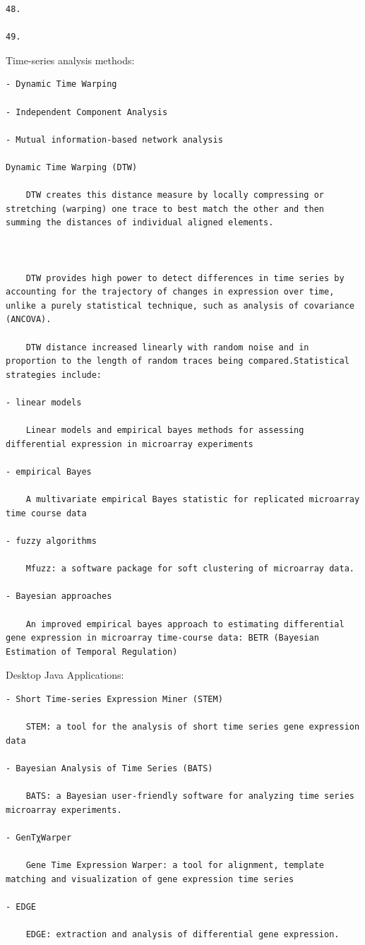 \documentclass[
]{book}
\begin{document}
\begin{verbatim}
48.

49.
\end{verbatim}

Time-series analysis methods:

\begin{verbatim}
- Dynamic Time Warping

- Independent Component Analysis

- Mutual information-based network analysis

Dynamic Time Warping (DTW)

    DTW creates this distance measure by locally compressing or stretching (warping) one trace to best match the other and then summing the distances of individual aligned elements.



    DTW provides high power to detect differences in time series by accounting for the trajectory of changes in expression over time, unlike a purely statistical technique, such as analysis of covariance (ANCOVA).

    DTW distance increased linearly with random noise and in proportion to the length of random traces being compared.Statistical strategies include:

- linear models

    Linear models and empirical bayes methods for assessing differential expression in microarray experiments

- empirical Bayes

    A multivariate empirical Bayes statistic for replicated microarray time course data

- fuzzy algorithms

    Mfuzz: a software package for soft clustering of microarray data.

- Bayesian approaches

    An improved empirical bayes approach to estimating differential gene expression in microarray time-course data: BETR (Bayesian Estimation of Temporal Regulation)
\end{verbatim}

Desktop Java Applications:

\begin{verbatim}
- Short Time-series Expression Miner (STEM)

    STEM: a tool for the analysis of short time series gene expression data

- Bayesian Analysis of Time Series (BATS)

    BATS: a Bayesian user-friendly software for analyzing time series microarray experiments.

- GenTχWarper

    Gene Time Expression Warper: a tool for alignment, template matching and visualization of gene expression time series

- EDGE

    EDGE: extraction and analysis of differential gene expression.
\end{verbatim}
\end{document}
